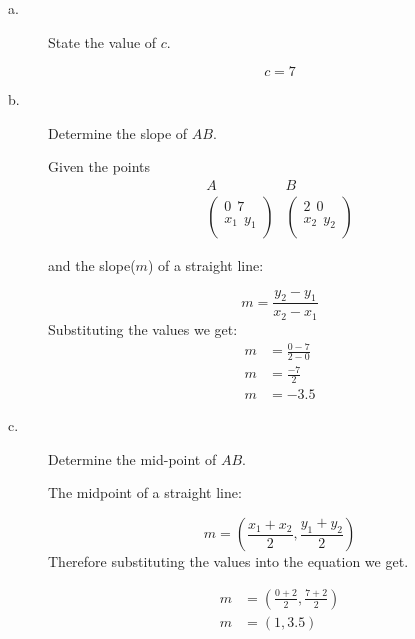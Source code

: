 \documentclass{article}
\begin{document}
\begin{description}
    \item[a.] \begin{large}State the value of $c$.\end{large}
        $$c = 7$$
    \item[b.] \begin{large}Determine the slope of $AB$.\end{large}
        Given the points
        $$
            \begin{array}{c}
                A \\
                \begin{pmatrix}
                    0 \ \ 7     \\
                    x_1 \ \ y_1 \\
                \end{pmatrix}
            \end{array}
            \begin{array}{c}
                B \\
                \begin{pmatrix}
                    2 \ \ 0     \\
                    x_2 \ \ y_2 \\
                \end{pmatrix}
            \end{array}
        $$

        and the slope($m$) of a straight line:

        $$
            m = \frac{y_2-y_1}{x_2-x_1}
        $$
        Substituting the values we get:
        $$
            \begin{aligned}
                m & = \frac{0-7}{2-0} \\
                m & = \frac{-7}{2}    \\
                m & = -3.5
            \end{aligned}
        $$

    \item[c.] \begin{large}Determine the mid-point of $AB$.\end{large}

        The midpoint of a straight line:

        $$
            m = (\frac{x_1+x_2}{2}, \frac{y_1+y_2}{2})
        $$
        Therefore substituting the values into the equation we get.

        $$
            \begin{aligned}
                m & = (\frac{0+2}{2}, \frac{7+2}{2}) \\
                m & = (1, 3.5)                       \\
            \end{aligned}
        $$
\end{description}
\end{document}
